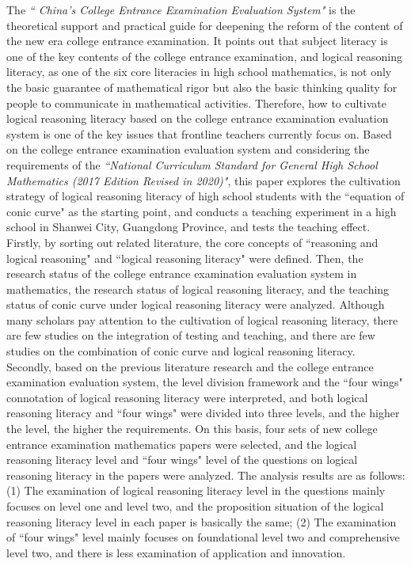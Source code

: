 \begin{eabstract}	
The \textsl{`` China's College Entrance Examination Evaluation System"} is the theoretical support and practical guide for deepening the reform of the content of the new era college entrance examination. It points out that subject literacy is one of the key contents of the college entrance examination, and logical reasoning literacy, as one of the six core literacies in high school mathematics, is not only the basic guarantee of mathematical rigor but also the basic thinking quality for people to communicate in mathematical activities. Therefore, how to cultivate logical reasoning literacy based on the college entrance examination evaluation system is one of the key issues that frontline teachers currently focus on. Based on the college entrance examination evaluation system and considering the requirements of the \textsl{``National Curriculum Standard for General High School Mathematics (2017 Edition Revised in 2020)"}, this paper explores the cultivation strategy of logical reasoning literacy of high school students with the ``equation of conic curve" as the starting point, and conducts a teaching experiment in a high school in Shanwei City, Guangdong Province, and tests the teaching effect. 
\\
\indent
Firstly, by sorting out related literature, the core concepts of ``reasoning and logical reasoning" and ``logical reasoning literacy" were defined. Then, the research status of the college entrance examination evaluation system in mathematics, the research status of  logical reasoning literacy, and the teaching status of conic curve under logical reasoning literacy were analyzed. Although many scholars pay attention to the cultivation of logical reasoning literacy, there are few studies on the integration of testing and teaching, and there are few studies on the combination of conic curve and logical reasoning literacy. 
\\
\indent
Secondly, based on the previous literature research and the college entrance examination evaluation system, the level division framework and the ``four wings" connotation of logical reasoning literacy were interpreted, and both logical reasoning literacy and ``four wings" were divided into three levels, and the higher the level, the higher the requirements. On this basis, four sets of new college entrance examination mathematics papers were selected, and the logical reasoning literacy level and ``four wings" level of the questions on logical reasoning literacy in the papers were analyzed. The analysis results are as follows: (1) The examination of logical reasoning literacy level in the questions mainly focuses on level one and level two, and the proposition situation of the logical reasoning literacy level in each paper is basically the same; (2) The examination of ``four wings" level mainly focuses on foundational level two and comprehensive level two, and there is less examination of application and innovation. 

\end{eabstract}

